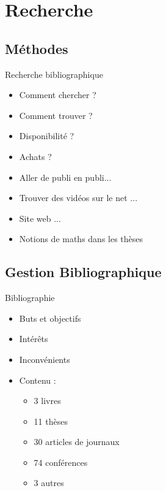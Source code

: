 \documentclass{beamer}
\begin{document}

\section{Recherche}
\subsection*{Méthodes}

\begin{frame}{Recherche bibliographique}
  \begin{itemize}
  \item Comment chercher ?
  \item Comment trouver ?
  \item Disponibilité ?
  \item Achats ?
  \item Aller de publi en publi...
  \item Trouver des vidéos sur le net ...
  \item Site web ...
  \item Notions de maths dans les thèses
  \end{itemize}
\end{frame}


\subsection*{Gestion Bibliographique}

\begin{frame}{Bibliographie}

  \begin{itemize}
  \item Buts et objectifs
  \item Intérêts %
  \item Inconvénients
    \vspace{5mm}
  \item Contenu : %
    \begin{itemize}
    \item 3 livres
    \item 11 thèses
    \item 30 articles de journaux
    \item 74 conférences
    \item 3 autres
    \end{itemize}
  \end{itemize}
\end{frame}
\end{document}
